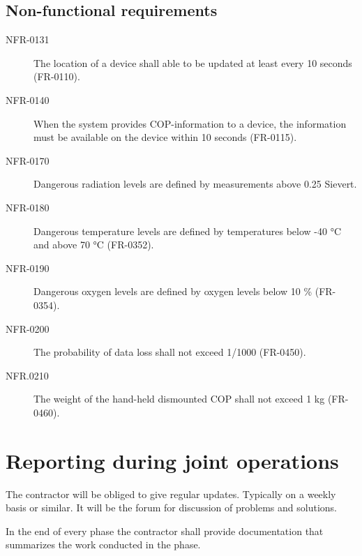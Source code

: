 \subsection{Non-functional requirements}
\begin{description}
\item[NFR-0131] The location of a device shall able to be updated at least every 10 seconds (FR-0110).
\item[NFR-0140] When the system provides COP-information to a device, the information must
be available on the device within 10 seconds (FR-0115).
\item[NFR-0170] Dangerous radiation levels are defined by measurements above 0.25 Sievert.
\item[NFR-0180] Dangerous temperature levels are defined by temperatures below -40 °C and
above 70 °C (FR-0352).
\item[NFR-0190] Dangerous oxygen levels are defined by oxygen levels below 10 \% (FR-0354).
\item[NFR-0200] The probability of data loss shall not exceed 1/1000 (FR-0450).
\item[NFR.0210] The weight of the hand-held dismounted COP shall not exceed 1 kg (FR-0460).
\end{description}



\section{Reporting during joint operations}
The contractor will be obliged to give regular updates. Typically on a weekly basis or similar. It will be the forum for discussion of problems and solutions. 

In the end of every phase the contractor shall provide documentation that summarizes the work conducted in the phase.